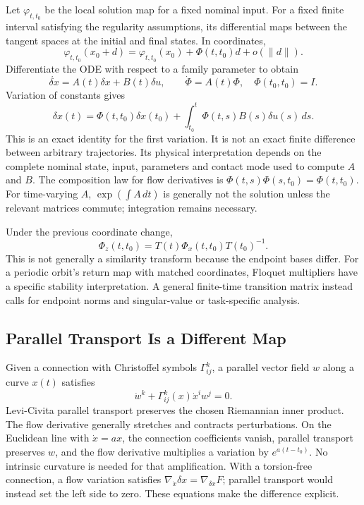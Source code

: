 Let $\varphi_{t,t_0}$ be the local solution map for a fixed nominal input. For a fixed
finite interval satisfying the regularity assumptions, its differential maps between
the tangent spaces at the initial and final states. In coordinates,
\begin{equation}
\varphi_{t,t_0}(x_0+d)=\varphi_{t,t_0}(x_0)+\Phi(t,t_0)d+o(\|d\|).
\label{eq:ch1:perturbed-traj}
\end{equation}
Differentiate the ODE with respect to a family parameter to obtain
\begin{equation}
\dot{\delta x}=A(t)\delta x+B(t)\delta u,\qquad
\dot\Phi=A(t)\Phi,\quad\Phi(t_0,t_0)=I.
\label{eq:ch1:variational-eq}
\end{equation}
Variation of constants gives
\begin{equation}
\delta x(t)=\Phi(t,t_0)\delta x(t_0)+\int_{t_0}^t\Phi(t,s)B(s)\delta u(s)\,ds.
\label{eq:ch1:dx-solution}
\end{equation}
This is an exact identity for the first variation. It is not an exact finite difference
between arbitrary trajectories. Its physical interpretation depends on the complete
nominal state, input, parameters and contact mode used to compute $A$ and $B$.
The composition law for flow derivatives is $\Phi(t,s)\Phi(s,t_0)=\Phi(t,t_0)$.
For time-varying $A$, $\exp(\int A\,dt)$ is generally not the solution unless the relevant
matrices commute; integration remains necessary.

Under the previous coordinate change,
\[
\Phi_z(t,t_0)=T(t)\Phi_x(t,t_0)T(t_0)^{-1}.
\]
This is not generally a similarity transform because the endpoint bases differ.
For a periodic orbit's return map with matched coordinates, Floquet multipliers have a
specific stability interpretation. A general finite-time transition matrix instead calls
for endpoint norms and singular-value or task-specific analysis.

\subsection{Parallel Transport Is a Different Map}

Given a connection with Christoffel symbols $\Gamma^k_{ij}$, a parallel vector field
$w$ along a curve $x(t)$ satisfies
\[
\dot w^k+\Gamma^k_{ij}(x)\dot x^i w^j=0.
\]
Levi-Civita parallel transport preserves the chosen Riemannian inner product. The flow
derivative generally stretches and contracts perturbations. On the Euclidean line with
$\dot x=ax$, the connection coefficients vanish, parallel transport preserves $w$, and
the flow derivative multiplies a variation by $e^{a(t-t_0)}$. No intrinsic curvature is
needed for that amplification. With a torsion-free connection, a flow variation satisfies
$\nabla_{\dot x}\delta x=\nabla_{\delta x}F$; parallel transport would instead set the
left side to zero. These equations make the difference explicit.

